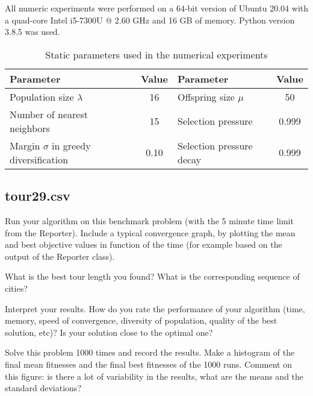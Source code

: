 \documentclass[a4paper,10pt]{article}
\newcommand{\ReplaceMe}[1]{{\color{blue}#1}}
\begin{document}
All numeric experiments were performed on a 64-bit version of Ubuntu 20.04 with a quad-core Intel i5-7300U @ 2.60 GHz and 16 GB of memory. Python version 3.8.5 was used.

\begin{table}[h]
\begin{center}
\caption{Static parameters used in the numerical experiments}
\label{table:experiments}
\begin{tabular}{|l|c||l|c|}\hline
\rowcolor[HTML]{C0C0C0}
Parameter	& Value		& Parameter	& Value \\ \hline
Population size $\lambda$	&16 	&Offspring size $\mu$	&50 \\
Number of nearest neighbors	& 15	& Selection pressure	& 0.999 \\
Margin $\sigma$ in greedy diversification	&0.10	&Selection pressure decay	&0.999 \\
\hline
\end{tabular}
\end{center}
\end{table}


\subsection{tour29.csv}

\ReplaceMe{Run your algorithm on this benchmark problem (with the 5 minute time limit from the Reporter). Include a typical convergence graph, by plotting the mean and best objective values in function of the time (for example based on the output of the Reporter class). 

What is the best tour length you found? What is the corresponding sequence of cities? 

Interpret your results. How do you rate the performance of your algorithm (time, memory, speed of convergence, diversity of population, quality of the best solution, etc)? Is your solution close to the optimal one?

Solve this problem 1000 times and record the results. Make a histogram of the final mean fitnesses and the final best fitnesses of the 1000 runs. Comment on this figure: is there a lot of variability in the results, what are the means and the standard deviations?}
\end{document}
